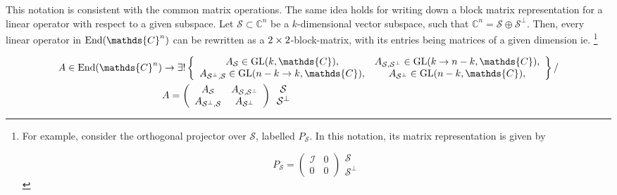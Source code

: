\documentclass{homework}
\begin{document}
This notation is consistent with the common matrix operations. The same idea holds for writing down a  block matrix representation for a linear operator with respect to a given subspace. Let $\mathcal{S} \subset \mathds{C}^n$ be a $k$-dimensional vector subspace, such that $\mathds{C}^n = \mathcal{S} \oplus \mathcal{S}^{\perp}$. Then, every linear operator in $\textnormal{End}(\mathds{C}^n)$ can be rewritten as a $2 \times 2$-block-matrix, with its entries being matrices of a given dimension ie. \footnote{
For example, consider the orthogonal projector over $\mathcal{S}$, labelled $P_{\mathcal{S}}$. In this notation, its matrix representation is given by 

\begin{equation*}
    P_{\mathcal{S}} = \left( \begin{array}{cc}
       \mathcal{I} & 0 \\
       0 & 0
    \end{array} \right) \begin{array}{c}
         \mathcal{S} \\
         \mathcal{S}^\perp
    \end{array} 
\end{equation*}}

\begin{equation*}
\begin{split}
    A \in \textnormal{End}(\mathds{C}^n) &\rightarrow \exists! \left\{\begin{array}{cc}
        A_{\mathcal{S}} \in \textnormal{GL}(k, \mathds{C}),  &  A_{\mathcal{S}, \mathcal{S}^\perp} \in \textnormal{GL}(k \rightarrow n-k, \mathds{C}), \\
        A_{\mathcal{S}^\perp, \mathcal{S}}  \in  \textnormal{GL}(n-k \rightarrow k, \mathds{C}), & A_{\mathcal{S}^\perp} \in \textnormal{GL}(n-k, \mathds{C}),
    \end{array} \right\} / \\
   &A = \left( \begin{array}{cc}
       A_{\mathcal{S}} & A_{\mathcal{S}, \mathcal{S}^\perp}  \\
       A_{\mathcal{S}^\perp, \mathcal{S}} & A_{\mathcal{S}^\perp} 
    \end{array} \right) \begin{array}{c}
         \mathcal{S} \\
         \mathcal{S}^\perp
    \end{array}
    \end{split}
\end{equation*}
\end{document}
